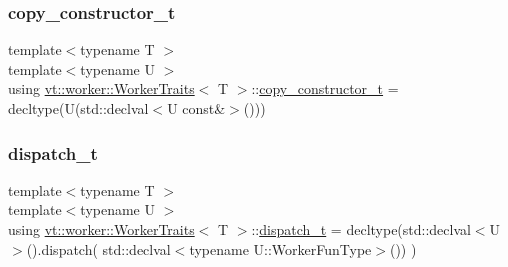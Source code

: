 \mbox{\label{structvt_1_1worker_1_1_worker_traits_a5018e778cb47740877e26c016a077e78}} 
\subsubsection{\texorpdfstring{copy\+\_\+constructor\+\_\+t}{copy\_constructor\_t}}
{\footnotesize\ttfamily template$<$typename T $>$ \\
template$<$typename U $>$ \\
using \hyperlink{structvt_1_1worker_1_1_worker_traits}{vt\+::worker\+::\+Worker\+Traits}$<$ T $>$\+::\hyperlink{structvt_1_1worker_1_1_worker_traits_a5018e778cb47740877e26c016a077e78}{copy\+\_\+constructor\+\_\+t} =  decltype(U(std\+::declval$<$U const\&$>$()))}

\mbox{\label{structvt_1_1worker_1_1_worker_traits_ae3d04fe828e40c570a63b969b982e5d4}} 
\subsubsection{\texorpdfstring{dispatch\+\_\+t}{dispatch\_t}}
{\footnotesize\ttfamily template$<$typename T $>$ \\
template$<$typename U $>$ \\
using \hyperlink{structvt_1_1worker_1_1_worker_traits}{vt\+::worker\+::\+Worker\+Traits}$<$ T $>$\+::\hyperlink{structvt_1_1worker_1_1_worker_traits_ae3d04fe828e40c570a63b969b982e5d4}{dispatch\+\_\+t} =  decltype(std\+::declval$<$U$>$().dispatch( std\+::declval$<$typename U\+::\+Worker\+Fun\+Type$>$()) )}

\mbox{\label{structvt_1_1worker_1_1_worker_traits_a017de8e435dfce71e241f5288e199454}} 
